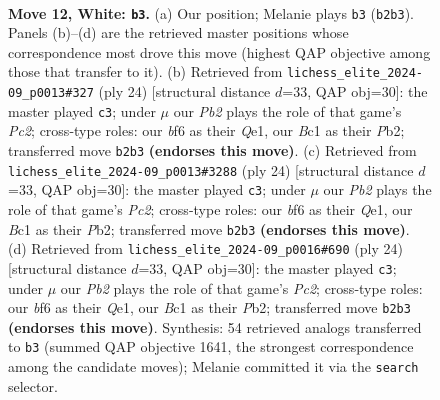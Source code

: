 \documentclass[11pt]{article}
\begin{document}
\clearpage

\begin{figure}[p]\centering
\begin{subfigure}{0.46\textwidth}\centering
\resizebox{\linewidth}{!}{%
\newchessgame
\chessboard[
  setfen={r1b1q1k1/pppp1ppp/3n1b2/8/3P4/8/PPP2PPP/RNBQ1BK1 w - - 0 12},
  showmover=false,
  pgfstyle=straightmove, color=movearrow, markmove={b2-b3}
]}
\caption{}
\end{subfigure}\hfill
\begin{subfigure}{0.46\textwidth}\centering
\resizebox{\linewidth}{!}{%
\newchessgame
\chessboard[
  setfen={r1bqn1k1/pppp1ppp/5b2/8/3P1B2/8/PPP2PPP/RN2QBK1 w - - 1 13},
  showmover=false,
  pgfstyle=straightmove, color=movearrow, markmove={c2-c3}
]}
\caption{}
\end{subfigure}
\\[4pt]
\begin{subfigure}{0.46\textwidth}\centering
\resizebox{\linewidth}{!}{%
\newchessgame
\chessboard[
  setfen={r1bqn1k1/pppp1ppp/5b2/8/3P1B2/8/PPP2PPP/RN2QBK1 w - - 1 13},
  showmover=false,
  pgfstyle=straightmove, color=movearrow, markmove={c2-c3}
]}
\caption{}
\end{subfigure}\hfill
\begin{subfigure}{0.46\textwidth}\centering
\resizebox{\linewidth}{!}{%
\newchessgame
\chessboard[
  setfen={r1bqn1k1/pppp1ppp/5b2/8/3P1B2/8/PPP2PPP/RN2QBK1 w - - 1 13},
  showmover=false,
  pgfstyle=straightmove, color=movearrow, markmove={c2-c3}
]}
\caption{}
\end{subfigure}
\caption{\textbf{Move 12, White: \texttt{b3}.} (a) Our position; Melanie plays \texttt{b3} (\texttt{b2b3}). Panels (b)--(d) are the retrieved master positions whose correspondence most drove this move (highest QAP objective among those that transfer to it). (b) Retrieved from \texttt{lichess\_elite\_2024-09\_p0013\#327} (ply 24) [structural distance $d$=33, QAP obj=30]: the master played \texttt{c3}; under $\mu$ our \emph{Pb2} plays the role of that game's \emph{Pc2}; cross-type roles: our \emph{b}f6 as their \emph{Q}e1, our \emph{B}c1 as their \emph{P}b2; transferred move \texttt{b2b3} \textbf{(endorses this move)}. (c) Retrieved from \texttt{lichess\_elite\_2024-09\_p0013\#3288} (ply 24) [structural distance $d$=33, QAP obj=30]: the master played \texttt{c3}; under $\mu$ our \emph{Pb2} plays the role of that game's \emph{Pc2}; cross-type roles: our \emph{b}f6 as their \emph{Q}e1, our \emph{B}c1 as their \emph{P}b2; transferred move \texttt{b2b3} \textbf{(endorses this move)}. (d) Retrieved from \texttt{lichess\_elite\_2024-09\_p0016\#690} (ply 24) [structural distance $d$=33, QAP obj=30]: the master played \texttt{c3}; under $\mu$ our \emph{Pb2} plays the role of that game's \emph{Pc2}; cross-type roles: our \emph{b}f6 as their \emph{Q}e1, our \emph{B}c1 as their \emph{P}b2; transferred move \texttt{b2b3} \textbf{(endorses this move)}. Synthesis: 54 retrieved analogs transferred to \texttt{b3} (summed QAP objective 1641, the strongest correspondence among the candidate moves); Melanie committed it via the \texttt{search} selector.}
\label{fig:thought-m22}
\end{figure}
\end{document}
